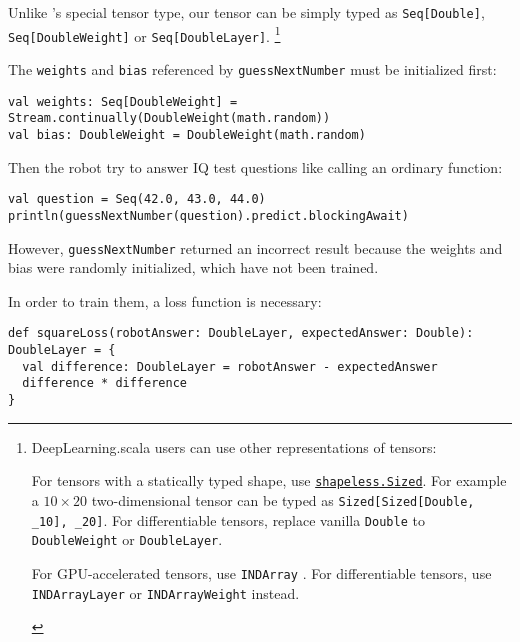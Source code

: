 Unlike \cite{chen2017typesafe}'s special tensor type, our tensor can be simply typed as \lstinline{Seq[Double]}, \lstinline{Seq[DoubleWeight]} or \lstinline{Seq[DoubleLayer]}.
\footnote{DeepLearning.scala users can use other representations of tensors:
\begin{enumerate*}
  \item For tensors with a statically typed shape, use \href{https://javadoc.io/page/com.chuusai/shapeless_2.11/latest/shapeless/Sized.html}{ \lstinline{shapeless.Sized}}. For example a $10\times20$ two-dimensional tensor can be typed as \lstinline{Sized[Sized[Double, _10], _20]}. For differentiable tensors, replace vanilla \lstinline{Double} to \lstinline{DoubleWeight} or \lstinline{DoubleLayer}.
  \item For GPU-accelerated tensors, use \lstinline{INDArray} \cite{skymind2017nd4j}. For differentiable tensors, use \lstinline{INDArrayLayer} or \lstinline{INDArrayWeight} instead.
\end{enumerate*}
}

The \lstinline{weights} and \lstinline{bias} referenced by \lstinline{guessNextNumber} must be initialized first:

\begin{lstlisting}[float={htbp},caption={Weight initialization}]
val weights: Seq[DoubleWeight] = Stream.continually(DoubleWeight(math.random))
val bias: DoubleWeight = DoubleWeight(math.random)
\end{lstlisting}

Then the robot try to answer IQ test questions like calling an ordinary function:

\begin{lstlisting}[float={htbp},caption={Inference on an untrained model}]
val question = Seq(42.0, 43.0, 44.0)
println(guessNextNumber(question).predict.blockingAwait)
\end{lstlisting}

However, \lstinline{guessNextNumber} returned an incorrect result because the weights and bias were randomly initialized, which have not been trained.

In order to train them, a loss function is necessary:

\begin{lstlisting}[float={htbp},caption={The differentiable square loss function},label={squareLoss}]
def squareLoss(robotAnswer: DoubleLayer, expectedAnswer: Double): DoubleLayer = {
  val difference: DoubleLayer = robotAnswer - expectedAnswer
  difference * difference
}
\end{lstlisting}

